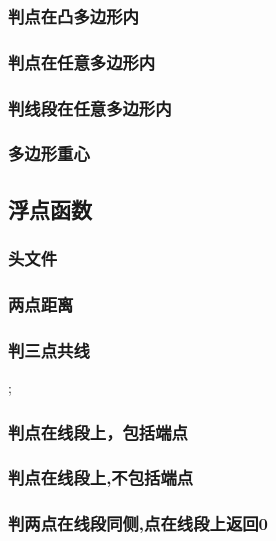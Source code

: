 \subsubsection{判点在凸多边形内}

\subsubsection{判点在任意多边形内}

\subsubsection{判线段在任意多边形内}

\subsubsection{多边形重心}


\subsection{浮点函数}
\subsubsection{头文件}

\subsubsection{两点距离}

\subsubsection{判三点共线}
;
\subsubsection{判点在线段上，包括端点}

\subsubsection{判点在线段上,不包括端点}

\subsubsection{判两点在线段同侧,点在线段上返回0}

